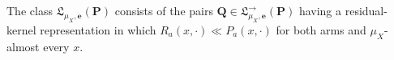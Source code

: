 The class \(\mathfrak L_{\mu_X,\boldsymbol e}(\boldsymbol P)\) consists of the pairs \(\boldsymbol Q\in\mathfrak L^{\to}_{\mu_X,\boldsymbol e}(\boldsymbol P)\) having a residual-kernel representation in which \(R_a(x,\cdot)\ll P_a(x,\cdot)\) for both arms and \(\mu_X\)-almost every \(x\).